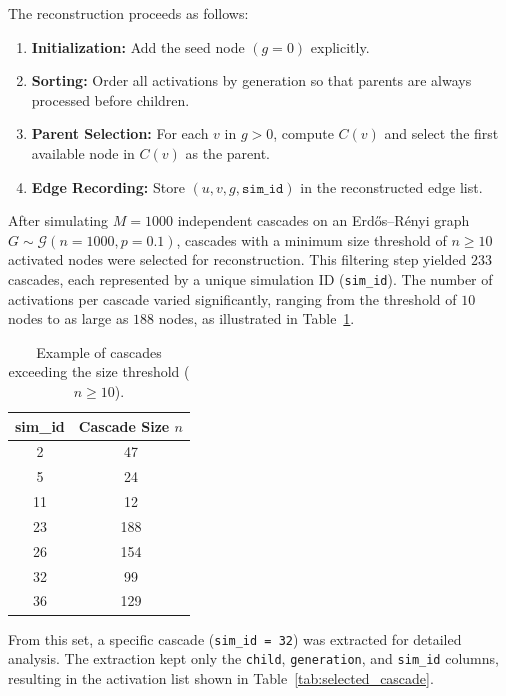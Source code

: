 \documentclass{article}
\begin{document}
\begin{enumerate}
The reconstruction proceeds as follows:
\begin{enumerate}
    \item \textbf{Initialization:} Add the seed node $(g=0)$ explicitly.
    \item \textbf{Sorting:} Order all activations by generation so that parents are always processed before children.
    \item \textbf{Parent Selection:} For each $v$ in $g>0$, compute $C(v)$ and select the first available node in $C(v)$ as the parent.
    \item \textbf{Edge Recording:} Store $(u, v, g, \texttt{sim\_id})$ in the reconstructed edge list.
\end{enumerate}
\vspace{0.5cm}
After simulating $M = 1000$ independent cascades on an Erd\H{o}s–R\'enyi graph $G \sim \mathcal{G}(n=1000, p=0.1)$, cascades with a minimum size threshold of $n \geq 10$ activated nodes were selected for reconstruction. This filtering step yielded $233$ cascades, each represented by a unique simulation ID (\texttt{sim\_id}). The number of activations per cascade varied significantly, ranging from the threshold of $10$ nodes to as large as $188$ nodes, as illustrated in Table~\ref{tab:large_cascades_example}.

\begin{table}[H]
\centering
\caption{Example of cascades exceeding the size threshold ($n \geq 10$).}
\label{tab:large_cascades_example}
\begin{tabular}{c c}
\hline
\textbf{sim\_id} & \textbf{Cascade Size $n$} \\
\hline
2 & 47 \\
5 & 24 \\
11 & 12 \\
23 & 188 \\
26 & 154 \\
32 & 99 \\
36 & 129 \\
\hline
\end{tabular}
\end{table}

From this set, a specific cascade (\texttt{sim\_id = 32}) was extracted for detailed analysis. The extraction kept only the \texttt{child}, \texttt{generation}, and \texttt{sim\_id} columns, resulting in the activation list shown in Table~\ref{tab:selected_cascade}.  


\end{enumerate}
\end{document}
